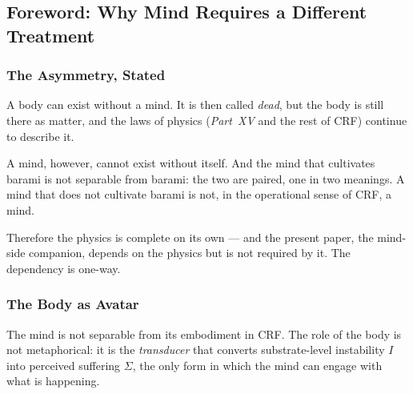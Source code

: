 \documentclass[12pt, a4paper]{article}
\begin{document}
\begin{abstract}
\textbf{Scope discipline.} This paper does not modify any item under
the CRF-Specific Lock. It does not introduce a new $d_s$-bearing
claim, a new identity, or a new measurement. It introduces a new
mode of an existing operator and a discrete choice structure for
that mode.

This paper is offered as a standalone deliverable per CLM-AM04 and
registered to the CRF v17.x Integration Queue as Slot~4b.
\end{abstract}

\tableofcontents
\newpage

\subsection{Foreword: Why Mind Requires a Different Treatment}

\subsubsection{The Asymmetry, Stated}

\begin{keybox}[title={The ontological asymmetry}]
A body can exist without a mind. It is then called \emph{dead}, but
the body is still there as matter, and the laws of physics
(\emph{Part~XV} and the rest of CRF) continue to describe it.
\smallskip

A mind, however, cannot exist without itself. And the mind that
cultivates barami is not separable from barami: the two are paired,
one in two meanings. A mind that does not cultivate barami is not, in
the operational sense of CRF, a mind.
\smallskip

Therefore the physics is complete on its own --- and the present
paper, the mind-side companion, depends on the physics but is not
required by it. The dependency is one-way.
\end{keybox}

\subsubsection{The Body as Avatar}

The mind is not separable from its embodiment in CRF. The role of the
body is not metaphorical: it is the \emph{transducer} that converts
substrate-level instability $I$ into perceived suffering $\Sigma$,
the only form in which the mind can engage with what is happening.
\end{document}
